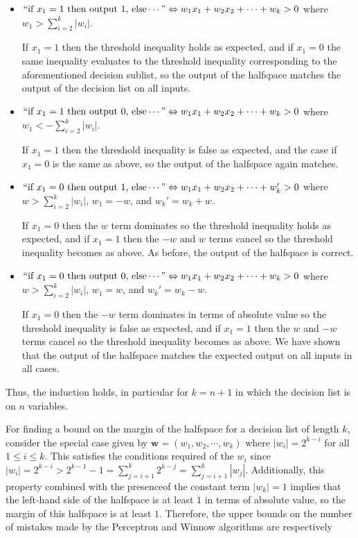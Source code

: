 \documentclass[a4paper,12pt]{article}
\theoremstyle{remark}
\newcommand{\bs}{\boldsymbol}
\begin{document}
    \begin{itemize}
        \item
            $``\text{if } x_1 = 1 \text{ then output } 1 \text{, else} \cdots" \Leftrightarrow w_1 x_1 + w_2 x_2 + \cdots + w_k > 0$ where $w_1 > \sum_{i = 2}^k |w_i|$. \par
            If $x_1 = 1$ then the threshold inequality holds as expected, and if $x_1 = 0$ the same inequality evaluates to the threshold inequality corresponding to the aforementioned decision sublist, so the output of the halfspace matches the output of the decision list on all inputs.
        \item
            $``\text{if } x_1 = 1 \text{ then output } 0 \text{, else} \cdots" \Leftrightarrow w_1 x_1 + w_2 x_2 + \cdots + w_k > 0$ where $w_1 < -\sum_{i = 2}^k |w_i|$. \par
            If $x_1 = 1$ then the threshold inequality is false as expected, and the case if $x_1 = 0$ is the same as above, so the output of the halfspace again matches.
        \item
            $``\text{if } x_1 = 0 \text{ then output } 1 \text{, else} \cdots" \Leftrightarrow w_1 x_1 + w_2 x_2 + \cdots + w_k' > 0$ where $w > \sum_{i = 2}^k |w_i|$, $w_1 = -w$, and $w_k' = w_k + w$. \par
            If $x_1 = 0$ then the $w$ term dominates so the threshold inequality holds as expected, and if $x_1 = 1$ then the $-w$ and $w$ terms cancel so the threshold inequality becomes as above. As before, the output of the halfspace is correct.
        \item
            $``\text{if } x_1 = 0 \text{ then output } 0 \text{, else} \cdots" \Leftrightarrow w_1 x_1 + w_2 x_2 + \cdots + w_k > 0$ where $w > \sum_{i = 2}^k |w_i|$, $w_1 = w$, and $w_k' = w_k - w$. \par
            If $x_1 = 0$ then the $-w$ term dominates in terms of absolute value so the threshold inequality is false as expected, and if $x_1 = 1$ then the $w$ and $-w$ terms cancel so the threshold inequality becomes as above. We have shown that the output of the halfspace matches the expected output on all inputs in all cases.
    \end{itemize}
    Thus, the induction holds, in particular for $k = n + 1$ in which the decision list is on $n$ variables. \par
    For finding a bound on the margin of the halfspace for a decision list of length $k$, consider the special case given by $\bs{w} = (w_1, w_2, \cdots, w_k)$ where $|w_i| = 2^{k - i}$ for all $1 \leq i \leq k$. This satisfies the conditions required of the $w_i$ since $|w_i| = 2^{k - i} > 2^{k - 1} - 1 = \sum_{j = i + 1}^k 2^{k - j} = \sum_{j = i + 1}^k |w_j|$. Additionally, this property combined with the presenceof the constant term $|w_k| = 1$ implies that the left-hand side of the halfspace is at least $1$ in terms of absolute value, so the margin of this halfspace is at least $1$. Therefore, the upper bounds on the number of mistakes made by the Perceptron and Winnow algorithms are respectively
\end{document}
